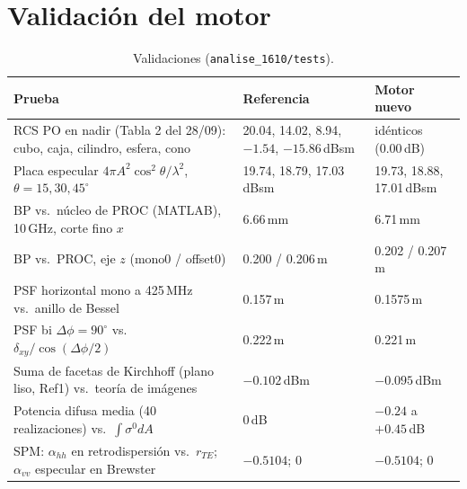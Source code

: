\section{Validación del motor}
\label{sec:validacion}

\begin{table}[H]
\centering\small
\caption{Validaciones (\texttt{analise\_1610/tests}).}
\label{tab:validacion}
\begin{tabular}{@{}L{5.6cm}L{4.4cm}L{4.4cm}@{}}
\toprule
\textbf{Prueba} & \textbf{Referencia} & \textbf{Motor nuevo} \\
\midrule
RCS PO en nadir (Tabla 2 del 28/09): cubo, caja, cilindro, esfera, cono
 & 20.04, 14.02, 8.94, $-1.54$, $-15.86$\,dBsm & idénticos (0.00\,dB) \\
Placa especular $4\pi A^2\cos^2\theta/\lambda^2$, $\theta=15,30,45^{\circ}$
 & 19.74, 18.79, 17.03\,dBsm & 19.73, 18.88, 17.01\,dBsm \\
BP vs.\ núcleo de PROC (MATLAB), 10\,GHz, corte fino $x$ & 6.66\,mm & 6.71\,mm \\
BP vs.\ PROC, eje $z$ (mono0 / offset0) & 0.200 / 0.206\,m & 0.202 / 0.207\,m \\
PSF horizontal mono a 425\,MHz vs.\ anillo de Bessel & 0.157\,m & 0.1575\,m \\
PSF bi $\Delta\phi=90^{\circ}$ vs.\ $\delta_{xy}/\cos(\Delta\phi/2)$ & 0.222\,m & 0.221\,m \\
Suma de facetas de Kirchhoff (plano liso, Ref1) vs.\ teoría de imágenes & $-0.102$\,dBm & $-0.095$\,dBm \\
Potencia difusa media (40 realizaciones) vs.\ $\int\sigma^0dA$ & 0\,dB & $-0.24$ a $+0.45$\,dB \\
SPM: $\alpha_{hh}$ en retrodispersión vs.\ $r_{TE}$; $\alpha_{vv}$ especular en Brewster
 & $-0.5104$; 0 & $-0.5104$; 0 \\
\bottomrule
\end{tabular}
\end{table}
